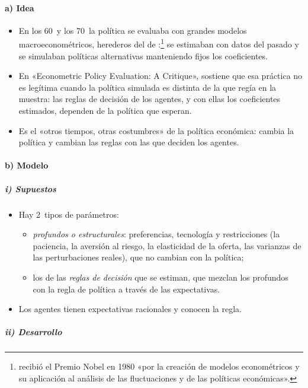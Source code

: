 \documentclass[11pt]{article}
\begin{document}
\paragraph{a) Idea}

\begin{itemize}
\item En los 60~y los 70~la política se evaluaba con grandes modelos macroeconométricos, herederos del de \textcite{KleinGoldberger1955Econometric}:\footnote{ recibió el Premio Nobel en 1980 «por la creación de modelos econométricos y su aplicación al análisis de las fluctuaciones y de las políticas económicas»\nocite{Nobel1980Klein}.} se estimaban con datos del pasado y se simulaban políticas alternativas manteniendo fijos los coeficientes.
\item En «Econometric Policy Evaluation: A Critique», \textcite{Lucas1976Econometric} sostiene que esa práctica no es legítima cuando la política simulada es distinta de la que regía en la muestra: las reglas de decisión de los agentes, y con ellas los coeficientes estimados, dependen de la política que esperan.
\item Es el «otros tiempos, otras costumbres» de la política económica: cambia la política y cambian las reglas con las que deciden los agentes.
\end{itemize}

\paragraph{b) Modelo}

\subparagraph{i) Supuestos}

\begin{itemize}
\item Hay 2~tipos de parámetros:
  \begin{itemize}
  \item \emph{profundos o estructurales}: preferencias, tecnología y restricciones (la paciencia, la aversión al riesgo, la elasticidad de la oferta, las varianzas de las perturbaciones reales), que no cambian con la política;
  \item los de las \emph{reglas de decisión} que se estiman, que mezclan los profundos con la regla de política a través de las expectativas.
  \end{itemize}
\item Los agentes tienen expectativas racionales y conocen la regla.
\end{itemize}

\subparagraph{ii) Desarrollo}
\end{document}

